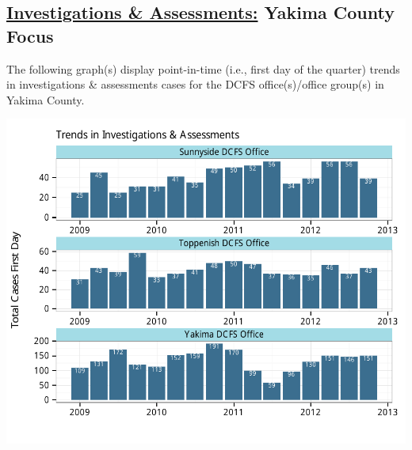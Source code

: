 \documentclass{article}\usepackage[]{graphicx}\usepackage[]{color}
\makeatletter
\def\maxwidth{ %
  \ifdim\Gin@nat@width>\linewidth
    \linewidth
  \else
    \Gin@nat@width
  \fi
}
\newenvironment{knitrout}{}{} %
\makeatother
\begin{document}
\begin{minipage}{\textwidth}
\subsection{\href{http://www.partnersforourchildren.org//child-well-being/visualizations/investigations-assessments/trends}
{Investigations \& Assessments:} Yakima County Focus}
The following graph(s) display point-in-time (i.e., first day of the quarter) trends in investigations \& assessments cases for the DCFS office(s)/office group(s) in Yakima County.  
\begin{knitrout}
\color{fgcolor}

{\centering \includegraphics[width=\maxwidth]{figure/ia_focus} 

}



\end{knitrout}

\end{minipage}

\newpage
\end{document}

